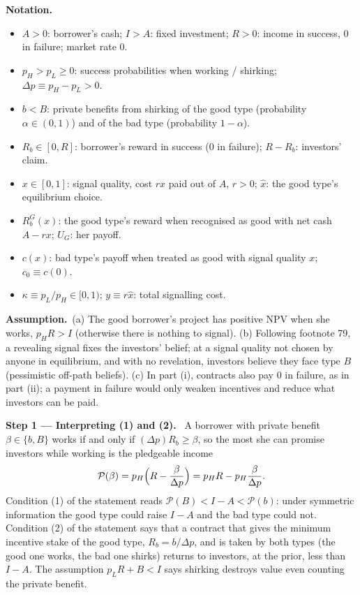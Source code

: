 \documentclass[11pt,a4paper]{article}
\newcommand{\notation}{\par\noindent\textbf{Notation.}}
\newcommand{\step}[2]{\par\medskip\noindent\textbf{Step #1 --- #2.}~}
\newcommand{\assume}{\par\smallskip\noindent\textbf{Assumption.}~}
\begin{document}
\notation
\begin{itemize}
  \item $A>0$: borrower's cash; $I>A$: fixed investment; $R>0$: income in success, $0$ in failure; market rate $0$.
  \item $p_H>p_L\ge0$: success probabilities when working / shirking; $\Delta p\equiv p_H-p_L>0$.
  \item $b<B$: private benefits from shirking of the good type (probability $\alpha\in(0,1)$) and of the bad type (probability $1-\alpha$).
  \item $R_b\in[0,R]$: borrower's reward in success (0 in failure); $R-R_b$: investors' claim.
  \item $x\in[0,1]$: signal quality, cost $rx$ paid out of $A$, $r>0$; $\hat x$: the good type's equilibrium choice.
  \item $R_b^G(x)$: the good type's reward when recognised as good with net cash $A-rx$; $U_G$: her payoff.
  \item $c(x)$: bad type's payoff when treated as good with signal quality $x$; $c_0\equiv c(0)$.
  \item $\kappa\equiv p_L/p_H\in[0,1)$; $y\equiv r\hat x$: total signalling cost.
\end{itemize}

\assume (a) The good borrower's project has positive NPV when she works, $p_HR>I$ (otherwise there is
nothing to signal). (b) Following footnote 79, a revealing signal fixes the investors' belief; at a
signal quality not chosen by anyone in equilibrium, and with no revelation, investors believe they face
type $B$ (pessimistic off-path beliefs). (c) In part (i), contracts also pay $0$ in failure, as in part (ii);
a payment in failure would only weaken incentives and reduce what investors can be paid.

\step{1}{Interpreting (1) and (2)} A borrower with private benefit $\beta\in\{b,B\}$ works if and only if
$(\Delta p)R_b\ge\beta$, so the most she can promise investors while working is the pledgeable income
\begin{align}
  \mathcal{P}(\beta) = p_H\Bigl(R-\frac{\beta}{\Delta p}\Bigr)
     = p_HR - p_H\frac{\beta}{\Delta p}. \label{t3e9-pledge}
\end{align}
Condition (1) of the statement reads $\mathcal{P}(B)<I-A<\mathcal{P}(b)$: under symmetric information the
good type could raise $I-A$ and the bad type could not. Condition (2) of the statement says that a
contract that gives the minimum incentive stake of the good type, $R_b=b/\Delta p$, and is taken by both
types (the good one works, the bad one shirks) returns to investors, at the prior, less than $I-A$.
The assumption $p_LR+B<I$ says shirking destroys value even counting the private benefit.
\end{document}
